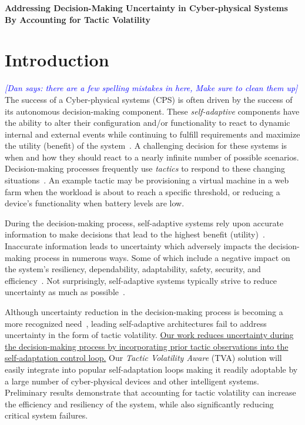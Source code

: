 \documentclass[11pt]{proposalnsf}
\newcommand{\dan}[1]{\textcolor{blue}{{\it [Dan says: #1]}}}
\newcommand{\Title}{Addressing Decision-Making Uncertainty in Cyber-physical Systems By Accounting for Tactic Volatility}
\newlength\q %
\begin{document}
\begin{sloppypar}
\setcounter{page}{1}


\centerline{\normalsize\bf \Title} 

\section{Introduction}
\dan{there are a few spelling mistakes in here, Make sure to clean them up}
The success of a Cyber-physical systems (CPS) is often driven by the success of its autonomous decision-making component. These \emph{self-adaptive} components have the ability to alter their configuration and/or functionality to react to dynamic internal and external events while continuing to fulfill requirements and maximize the utility (benefit) of the system~\cite{moreno2017decision}. A challenging decision for these systems is when and how they should react to a nearly infinite number of possible scenarios. Decision-making processes frequently use \emph{tactics} to respond to these changing situations~\cite{moreno2017adaptation}. An example tactic may be provisioning a virtual machine in a web farm when the workload is about to reach a specific threshold, or reducing a device's functionality when battery levels are low.

During the decision-making process, self-adaptive systems rely upon accurate information to make decisions that lead to the highest benefit (utility)~\cite{CMU-ISR-17-119,moreno2017decision}. Inaccurate information leads to uncertainty which adversely impacts the decision-making process in numerous ways. Some of which include a negative impact on the system's resiliency, dependability, adaptability, safety, security, and efficiency~\cite{esfahani2011taming, han2016handling}. Not surprisingly, self-adaptive systems typically strive to reduce uncertainty as much as possible~\cite{moreno2016efficient, camara2017uncertainty}. 

Although uncertainty reduction in the decision-making process is becoming a more recognized need~\cite{esfahani2011taming, moreno2016efficient, Moreno:2015:PSU:2786805.2786853,camara2017uncertainty}, leading self-adaptive architectures fail to address uncertainty in the form of tactic volatility. \ul{Our work reduces uncertainty during the decision-making process by incorporating prior tactic observations into the self-adaptation control loop.} Our \emph{Tactic Volatility Aware} (TVA) solution will easily integrate into  popular self-adaptation loops making it readily adoptable by a large number of cyber-physical devices and other intelligent systems. Preliminary results demonstrate that accounting for tactic volatility can increase the efficiency and resiliency of the system, while also significantly reducing critical system failures. 


\end{sloppypar}
\end{document}
